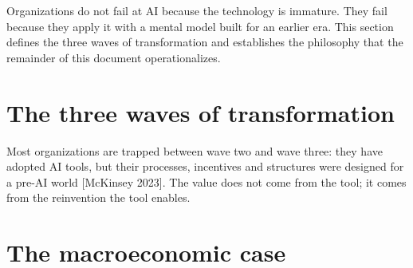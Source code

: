 
Organizations do not fail at AI because the technology is immature. They fail
because they apply it with a mental model built for an earlier era. This
section defines the three waves of transformation and establishes the
philosophy that the remainder of this document operationalizes.

\section{The three waves of transformation}

\vspace{-0.3em}
\par\vspace{0.7em}

\par\vspace{0.7em}

\par

Most organizations are trapped between wave two and wave three: they have
adopted AI tools, but their processes, incentives and structures were designed
for a pre-AI world [McKinsey 2023]. The value does not come from the tool; it
comes from the reinvention the tool enables.

\section{The macroeconomic case}

